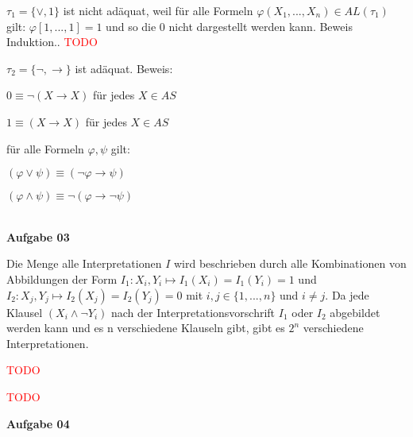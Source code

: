 \documentclass[a4paper,10pt]{article}
\begin{document}
\begin{compactenum} [(a)]
\begin{compactitem}
\begin{tabbing}
			\end{tabbing}
		\end{compactitem}
		\item \begin{compactitem}
			\item $ \tau_1 = \{\vee, 1\} $ ist nicht adäquat, weil für alle Formeln $ \varphi(X_1,...,X_n) \in AL(\tau_1) $ gilt: $ \varphi[1,...,1] = 1 $ und so die 0 nicht dargestellt werden kann. Beweis Induktion.. \textcolor{red}{TODO} %
			\item $ \tau_2 = \{\lnot, \rightarrow\} $ ist adäquat. Beweis:
			\begin{compactitem}
				\item $ 0 \equiv \lnot (X \rightarrow X) $  für jedes $ X \in AS $
				\item $ 1 \equiv (X \rightarrow X) $ für jedes $ X \in AS $
				\item für alle Formeln $ \varphi , \psi $ gilt:
				\begin{compactitem}
					\item $ (\varphi \vee \psi) \equiv (\lnot \varphi \rightarrow \psi) $
					\item $ (\varphi \wedge \psi) \equiv \lnot (\varphi \rightarrow \lnot \psi) $
				\end{compactitem}
			\end{compactitem}
		\end{compactitem}
	\end{compactenum} \
	\\
	\textbf{Aufgabe 03}
	\begin{compactenum} [(a)]
		\item Die Menge alle Interpretationen $ I $ wird beschrieben durch alle Kombinationen von Abbildungen der Form $ I_1: X_i, Y_i \longmapsto I_1(X_i) = I_1(Y_i) = 1 $ und $ I_2 : X_j, Y_j \longmapsto I_2(X_j) = I_2(Y_j) = 0 $ mit $ i,j \in \{1,...,n\} $ und $ i\neq j$. Da jede Klausel $ (X_i \wedge \lnot Y_i) $ nach der Interpretationsvorschrift $ I_1 $ oder $ I_2 $ abgebildet werden kann und es n verschiedene Klauseln gibt, gibt es $ 2^n $ verschiedene Interpretationen.
		\item \textcolor{red}{TODO}
		\item \textcolor{red}{TODO}
	\end{compactenum}
	\newpage
	\textbf{Aufgabe 04}\
\end{document}
